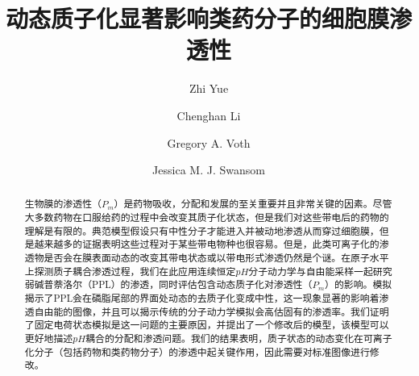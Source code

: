 \documentclass[journal=,manuscript=artical,email=false]{achemso}
\author{Zhi Yue}
\author{Chenghan Li}
\author{Gregory A. Voth}
\author{Jessica M. J. Swansom}
\title[动态质子化显著影响类药分子的细胞膜渗透性]
  {动态质子化显著影响类药分子的细胞膜渗透性}
\begin{document}
\thispagestyle{fancy}
\fancyhead{}
\chead{}
\rhead{}
\lfoot{}
\rfoot{}
\renewcommand{\headrulewidth}{0pt}
\renewcommand{\footrulewidth}{0.7pt}


%
%
%
%
%

\begin{abstract}
生物膜的渗透性（$P_m$）是药物吸收，分配和发展的至关重要并且非常关键的因素。尽管大多数药物在口服给药的过程中会改变其质子化状态，但是我们对这些带电后的药物的理解是有限的。典范模型假设只有中性分子才能进入并被动地渗透从而穿过细胞膜，但是越来越多的证据表明这些过程对于某些带电物种也很容易。但是，此类可离子化的渗透物是否会在膜表面动态的改变其带电状态或以带电形式渗透仍然是个谜。在原子水平上探测质子耦合渗透过程，我们在此应用连续恒定$pH$分子动力学与自由能采样一起研究弱碱普萘洛尔（PPL）的渗透，同时评估包含动态质子化对渗透性（$P_m$）的影响。模拟揭示了PPL会在磷脂尾部的界面处动态的去质子化变成中性，这一现象显著的影响着渗透自由能的图像，并且可以揭示传统的分子动力学模拟会高估固有的渗透率。我们证明了固定电荷状态模拟是这一问题的主要原因，并提出了一个修改后的模型，该模型可以更好地描述$pH$耦合的分配和渗透问题。我们的结果表明，质子状态的动态变化在可离子化分子（包括药物和类药物分子）的渗透中起关键作用，因此需要对标准图像进行修改。
\end{abstract}
\end{document}
